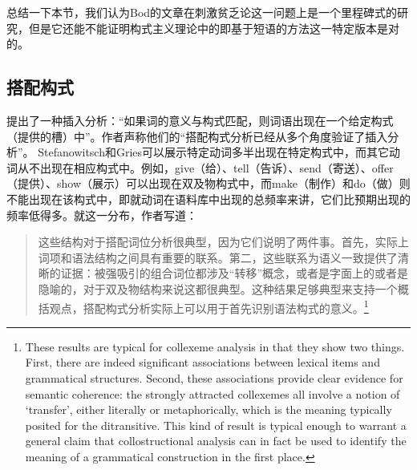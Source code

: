 \begin{exe}
\begin{xlist}[iv.]
\begin{exe}
\begin{xlist}[iv.]
总结一下本节，我们认为Bod的文章在刺激贫乏论这一问题上是一个里程碑式的研究，但是它还能不能证明构式主义理论中的即基于短语的方法这一特定版本是对的。

\subsection{搭配构式}

\mbox{}\citet[\S~5]{SG2009a}提出了一种插入分析：“如果词的意义与构式匹配，则词语出现在一个给定构式（提供的槽）中”。作者声称他们的“搭配构式分析已经从多个角度验证了插入分析”。 Stefanowitsch和Gries可以展示特定动词多半出现在特定构式中，而其它动词从不出现在相应构式中。例如，give（给）、tell（告诉）、send（寄送）、offer（提供）、show（展示）可以出现在双及物构式中，而make（制作）和do（做）则不能出现在该构式中，即就动词在语料库中出现的总频率来讲，它们比预期出现的频率低得多。就这一分布，作者写道：
\begin{quote}
这些结构对于搭配词位分析很典型，因为它们说明了两件事。首先，实际上词项和语法结构之间具有重要的联系。第二，这些联系为语义一致提供了清晰的证据：被强吸引的组合词位都涉及“转移”概念，或者是字面上的或者是隐喻的，对于双及物结构来说这都很典型。这种结果足够典型来支持一个概括观点，搭配构式分析实际上可以用于首先识别语法构式的意义。\citep[]{SG2009a}\footnote{%
  These results are typical for collexeme analysis in that they show two things. First, there are
  indeed significant associations between lexical items and grammatical structures. Second, these
  associations provide clear evidence for semantic coherence: the strongly attracted collexemes all
  involve a notion of `transfer', either literally or metaphorically, which is the meaning typically
  posited for the ditransitive. This kind of result is typical enough to warrant a general claim
  that collostructional analysis can in fact be used to identify the meaning of a grammatical
  construction in the first place.
  }
\end{quote}


\end{xlist}
\end{exe}
\end{xlist}
\end{exe}
